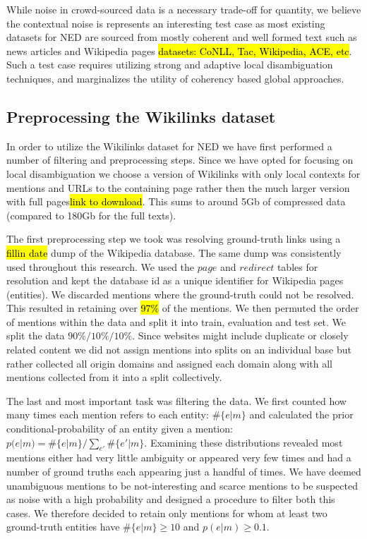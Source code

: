 \documentclass[11pt]{article}
\begin{document}
While noise in crowd-sourced data is a necessary trade-off for quantity, we believe the contextual noise is represents an interesting test case as most existing datasets for NED are sourced from mostly coherent and well formed text such as news articles and Wikipedia pages \hl{datasets: CoNLL, Tac, Wikipedia, ACE, etc}. Such a test case requires utilizing strong and adaptive local disambiguation techniques, and marginalizes the utility of coherency based global approaches.

\subsection{Preprocessing the Wikilinks dataset}

In order to utilize the Wikilinks dataset for NED we have first performed a number of filtering and preprocessing steps. Since we have opted for focusing on local disambiguation we choose a version of Wikilinks with only local contexts for mentions and URLs to the containing page rather then the much larger version with full pages\hl{link to download}. This sums to around 5Gb of compressed data (compared to 180Gb for the full texts).

The first preprocessing step we took was resolving ground-truth links using a \hl{fillin date} dump of the Wikipedia database. The same dump was consistently used throughout this research. We used the $page$ and $redirect$ tables for resolution and kept the database id as a unique identifier for Wikipedia pages (entities). We discarded mentions where the ground-truth could not be resolved. This resulted in retaining over \hl{97\%} of the mentions. We then permuted the order of mentions within the data and split it into train, evaluation and test set. We split the data $90\% / 10\% / 10\%$. Since websites might include duplicate or closely related content we did not assign mentions into splits on an individual base but rather collected all origin domains and assigned each domain along with all mentions collected from it into a split collectively.

The last and most important task was filtering the data. We first counted how many times each mention refers to each entity: $\#\{e|m\}$ and calculated the prior conditional-probability of an entity given a mention: $p(e|m)=\#\{e|m\}/\sum_{e'}\#\{e'|m\}$. Examining these distributions revealed most mentions either had very little ambiguity or appeared very few times and had a number of ground truths each appearing just a handful of times. We have deemed unambiguous mentions to be not-interesting and scarce mentions to be suspected as noise with a high probability and designed a procedure to filter both this cases. We therefore decided to retain only mentions for whom at least two ground-truth entities have $\#\{e|m\}\ge 10$ and $p(e|m)\ge0.1$. 
\end{document}
